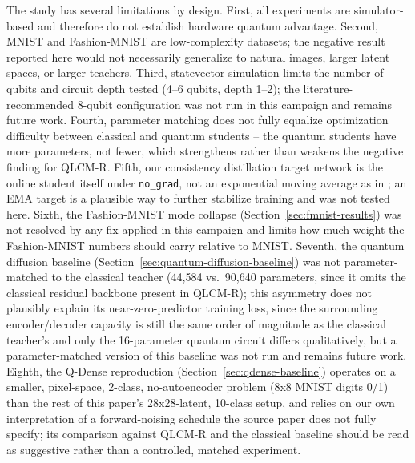\documentclass[11pt]{article}
\begin{document}
The study has several limitations by design. First, all experiments are
simulator-based and therefore do not establish hardware quantum advantage.
Second, MNIST and Fashion-MNIST are low-complexity datasets; the negative
result reported here would not necessarily generalize to natural images,
larger latent spaces, or larger teachers. Third, statevector simulation
limits the number of qubits and circuit depth tested (4--6 qubits, depth
1--2); the literature-recommended 8-qubit configuration was not run in this
campaign and remains future work. Fourth, parameter matching does not fully
equalize optimization difficulty between classical and quantum students --
the quantum students have more parameters, not fewer, which strengthens
rather than weakens the negative finding for QLCM-R. Fifth, our consistency
distillation target network is the online student itself under
\texttt{no\_grad}, not an exponential moving average as in
\citet{song2023consistency}; an EMA target is a plausible way to further
stabilize training and was not tested here. Sixth, the Fashion-MNIST mode
collapse (Section~\ref{sec:fmnist-results}) was not resolved by any fix applied in this campaign
and limits how much weight the Fashion-MNIST numbers should carry relative to
MNIST. Seventh, the quantum diffusion baseline
(Section~\ref{sec:quantum-diffusion-baseline}) was not parameter-matched to
the classical teacher (44{,}584 vs.\ 90{,}640 parameters, since it omits the
classical residual backbone present in QLCM-R); this asymmetry does not
plausibly explain its near-zero-predictor training loss, since the
surrounding encoder/decoder capacity is still the same order of magnitude as
the classical teacher's and only the 16-parameter quantum circuit differs
qualitatively, but a parameter-matched version of this baseline was not run
and remains future work. Eighth, the Q-Dense reproduction
(Section~\ref{sec:qdense-baseline}) operates on a smaller, pixel-space,
2-class, no-autoencoder problem (8x8 MNIST digits 0/1) than the rest of this
paper's 28x28-latent, 10-class setup, and relies on our own interpretation
of a forward-noising schedule the source paper does not fully specify; its
comparison against QLCM-R and the classical baseline should be read as
suggestive rather than a controlled, matched experiment.
\end{document}
